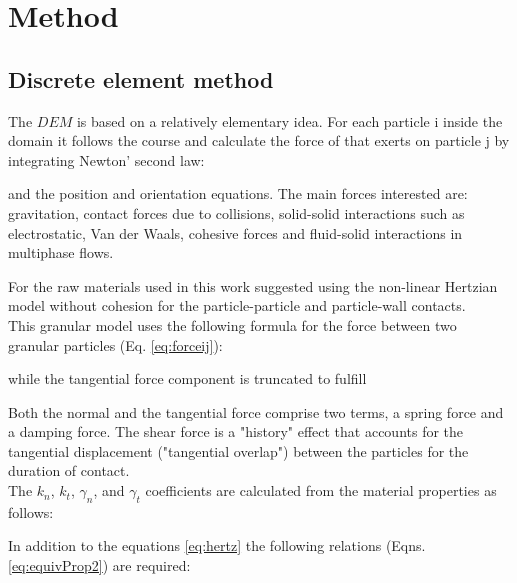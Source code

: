 
\section{Method}
\label{sec:method}





\subsection{Discrete element method}
\label{subsec:dem}
The $DEM$ is based on a relatively elementary idea. For each particle i inside
the domain it follows the course and calculate the force of that exerts on particle j
by integrating Newton' second law:

and the position and orientation equations.
The main forces interested are: gravitation, contact forces due to collisions,
solid-solid interactions such as electrostatic, Van der Waals, cohesive forces
and fluid-solid interactions in multiphase flows.

For the raw materials used in this work \cite{RefWorks:145} suggested using the non-linear Hertzian model without cohesion for the particle-particle and particle-wall contacts.\\
This granular model uses the following formula for the force between two granular particles (Eq. \ref{eq:forceij}):

while the tangential force component is truncated to fulfill

Both the normal and the tangential force comprise two terms, a spring force and a damping force. The shear force is a "history" effect that accounts for the tangential displacement 
("tangential overlap") between the particles for the duration of contact. \\

The $k_n$, $k_t$, $\gamma_n$, and $\gamma_t$ coefficients are calculated from the material properties as follows:

In addition to the equations \ref{eq:hertz} the following relations (Eqns. \ref{eq:equivProp2}) are required:


